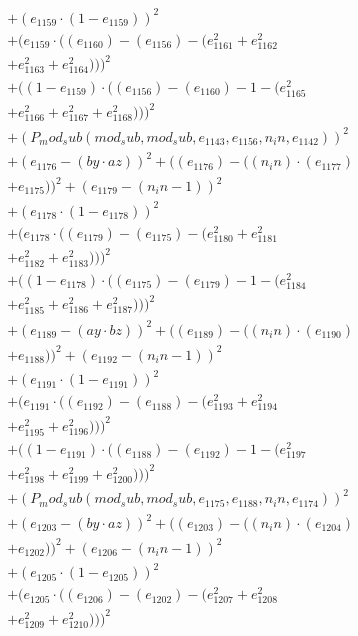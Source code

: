 \documentclass[10pt, a4paper]{article}
\begin{document}
\begin{align*}
& + (e_{1159}  \cdot  (1 - e_{1159}))^{2} \\
& + (e_{1159}  \cdot  ((e_{1160}) - (e_{1156}) - (e_{1161}^{2} + e_{1162}^{2} \\
& + e_{1163}^{2} + e_{1164}^{2})))^{2} \\
& + ((1 - e_{1159})  \cdot  ((e_{1156}) - (e_{1160}) - 1 - (e_{1165}^{2} \\
& + e_{1166}^{2} + e_{1167}^{2} + e_{1168}^{2})))^{2} \\
& + (P_mod_sub(mod_sub, mod_sub, e_{1143}, e_{1156}, n_in, e_{1142}))^{2} \\
& + (e_{1176} - (by  \cdot  az))^{2} + ((e_{1176}) - ((n_in)  \cdot  (e_{1177}) \\
& + e_{1175}))^{2} + (e_{1179} - (n_in - 1))^{2} \\
& + (e_{1178}  \cdot  (1 - e_{1178}))^{2} \\
& + (e_{1178}  \cdot  ((e_{1179}) - (e_{1175}) - (e_{1180}^{2} + e_{1181}^{2} \\
& + e_{1182}^{2} + e_{1183}^{2})))^{2} \\
& + ((1 - e_{1178})  \cdot  ((e_{1175}) - (e_{1179}) - 1 - (e_{1184}^{2} \\
& + e_{1185}^{2} + e_{1186}^{2} + e_{1187}^{2})))^{2} \\
& + (e_{1189} - (ay  \cdot  bz))^{2} + ((e_{1189}) - ((n_in)  \cdot  (e_{1190}) \\
& + e_{1188}))^{2} + (e_{1192} - (n_in - 1))^{2} \\
& + (e_{1191}  \cdot  (1 - e_{1191}))^{2} \\
& + (e_{1191}  \cdot  ((e_{1192}) - (e_{1188}) - (e_{1193}^{2} + e_{1194}^{2} \\
& + e_{1195}^{2} + e_{1196}^{2})))^{2} \\
& + ((1 - e_{1191})  \cdot  ((e_{1188}) - (e_{1192}) - 1 - (e_{1197}^{2} \\
& + e_{1198}^{2} + e_{1199}^{2} + e_{1200}^{2})))^{2} \\
& + (P_mod_sub(mod_sub, mod_sub, e_{1175}, e_{1188}, n_in, e_{1174}))^{2} \\
& + (e_{1203} - (by  \cdot  az))^{2} + ((e_{1203}) - ((n_in)  \cdot  (e_{1204}) \\
& + e_{1202}))^{2} + (e_{1206} - (n_in - 1))^{2} \\
& + (e_{1205}  \cdot  (1 - e_{1205}))^{2} \\
& + (e_{1205}  \cdot  ((e_{1206}) - (e_{1202}) - (e_{1207}^{2} + e_{1208}^{2} \\
& + e_{1209}^{2} + e_{1210}^{2})))^{2} \\

\end{align*}
\end{document}
